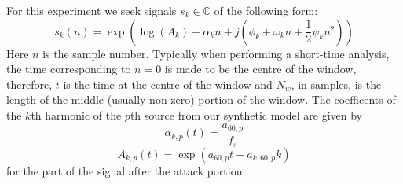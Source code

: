 For this experiment we seek signals $s_k \in \mathbb{C}$ of the following form:
\begin{equation}
    s_{k}(n) = \exp(\log(A_{k}) + \alpha_{k}n + j(\phi_{k} + \omega_{k}n +
    \frac{1}{2} \psi_{k} n^{2})) \label{eq:rm_model}
\end{equation}
Here $n$ is the sample number. Typically when performing a short-time analysis,
the time corresponding to $n = 0$ is made to be the centre of the window,
therefore, $t$ is the time at the centre of the window and $N_{w}$, in samples,
is the length of the middle (usually non-zero) portion of the window. The
coefficents of the $k$th harmonic of the $p$th source from our synthetic model
are given by
\begin{equation}
    \alpha_{k,p}(t) = \frac{a_{60,p}}{f_{s}}
\end{equation}
\begin{equation}
    A_{k,p}(t) = \exp(a_{60,p} t + a_{k,60,p} k)
\end{equation}
for the part of the signal after the attack portion.


